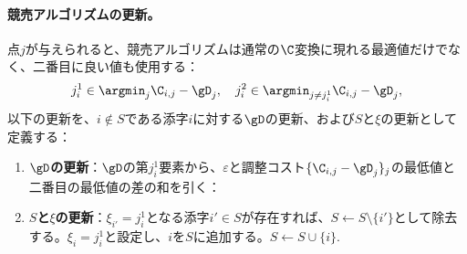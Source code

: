 \paragraph{競売アルゴリズムの更新。} 点$j$が与えられると、競売アルゴリズムは通常の$\C$変換に現れる最適値だけでなく、二番目に良い値も使用する：
$$j^1_i \in \argmin_{j} \C_{i,j} - \gD_{j}, \quad j^2_i \in \argmin_{j\ne j^1_i} \C_{i,j} - \gD_{j}, $$
以下の更新を、$i\notin S$である添字$i$に対する$\gD$の更新、および$S$と$\xi$の更新として定義する：
\begin{enumerate}\item \textbf{$\gD$の更新}：$\gD$の第$j^1_i$要素から、$\varepsilon$と調整コスト$\{\C_{i,j}-\gD_j\}_j$の最低値と二番目の最低値の差の和を引く：
\item \textbf{$S$と$\xi$の更新}：$\xi_{i'}=j^1_{i}$となる添字$i'\in S$が存在すれば、$S\leftarrow S\setminus \{i'\}$として除去する。$\xi_{i}=j^1_{i}$と設定し、$i$を$S$に追加する。$S\leftarrow S \cup \{i\}.$
\end{enumerate}

